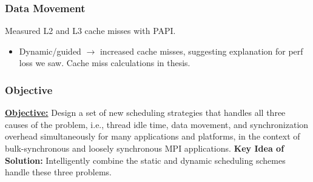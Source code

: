 \begin{frame}[label=dataMovement]
\frametitle{Data Movement}
{\tiny Measured L2 and L3 cache misses with PAPI.}
\begin{itemize}
\small \item \small Dynamic/guided $\rightarrow$ increased cache
  misses, suggesting explanation for perf loss we saw. Cache miss calculations in thesis.
\end{itemize}
\end{frame}

\begin{frame}[label=objective]
\frametitle{Objective}
\underline{\textbf{Objective:}} Design a set of new scheduling
strategies that handles all three causes of the problem, i.e., thread
idle time, data movement, and synchronization overhead simultaneously for
many applications and platforms, in the context of bulk-synchronous
and loosely synchronous MPI applications.
\textbf{Key Idea of Solution:} Intelligently combine the static and dynamic scheduling schemes handle these three problems. 

\end{frame}

